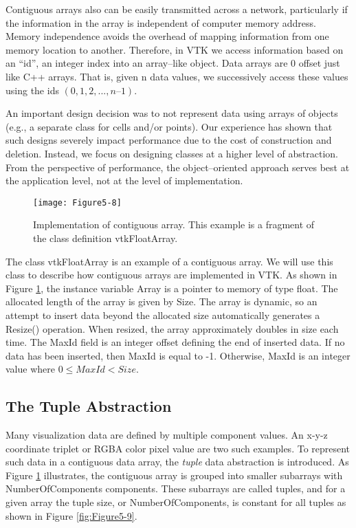 Contiguous arrays also can be easily transmitted across a network, particularly if the information in the array is independent of computer memory address. Memory independence avoids the overhead of mapping information from one memory location to another. Therefore, in VTK we access information based on an ``id'', an integer index into an array--like object. Data arrays are 0 offset just like C++ arrays. That is, given n data values, we successively access these values using the ids $(0, 1, 2, ..., n – 1)$.

An important design decision was to not represent data using arrays of objects (e.g., a separate class for cells and/or points). Our experience has shown that such designs severely impact performance due to the cost of construction and deletion. Instead, we focus on designing classes at a higher level of abstraction. From the perspective of performance, the object--oriented approach serves best at the application level, not at the level of implementation.

\begin{figure}[!htb]
	\centering
	\texttt{[image: Figure5-8]}
	\caption{Implementation of contiguous array. This example is a fragment of the class definition vtkFloatArray.}
	\label{fig:Figure5-8}
\end{figure}

The class vtkFloatArray is an example of a contiguous array. We will use this class to describe how contiguous arrays are implemented in VTK. As shown in Figure \ref{fig:Figure5-8}, the instance variable Array is a pointer to memory of type float. The allocated length of the array is given by Size. The array is dynamic, so an attempt to insert data beyond the allocated size automatically generates a Resize() operation. When resized, the array approximately doubles in size each time. The MaxId field is an integer offset defining the end of inserted data. If no data has been inserted, then MaxId is equal to -1. Otherwise, MaxId is an integer value where $0 \leq MaxId < Size$.

\subsection{The Tuple Abstraction}

Many visualization data are defined by multiple component values. An x-y-z coordinate triplet or RGBA color pixel value are two such examples. To represent such data in a contiguous data array, the \emph{tuple} data abstraction is introduced. As Figure \ref{fig:Figure5-8} illustrates, the contiguous array is grouped into smaller subarrays with NumberOfComponents components. These subarrays are called tuples, and for a given array the tuple size, or NumberOfComponents, is constant for all tuples as shown in Figure \ref{fig:Figure5-9}.

